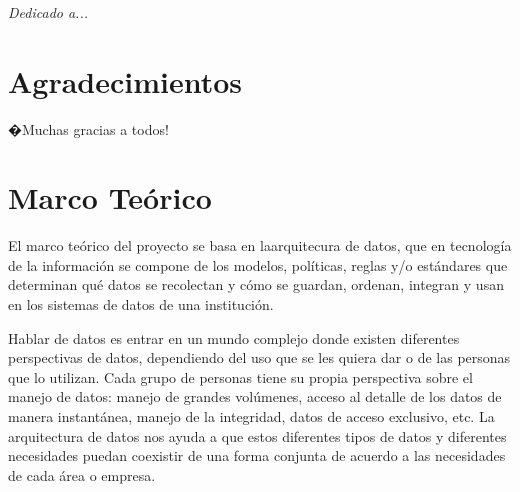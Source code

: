 \documentclass[a4paper,openright,12pt]{book}
\begin{document}
\newpage
$\ $
\thispagestyle{empty} %

\chapter*{}
\begin{flushright}
\textit{Dedicado a... \\}
\end{flushright}


\chapter*{Agradecimientos} %
 
�Muchas gracias a todos!

\tableofcontents %

\cleardoublepage
{} %
\listoffigures %

\cleardoublepage
{} %
\listoftables %

\chapter*{Marco Te\'orico} \label{cap.mteorico}%

El marco te\'orico del proyecto se basa en laarquitecura de datos, que en tecnolog\'ia de la informaci\'on se compone de los modelos, pol\'iticas, reglas y/o est\'andares que determinan qu\'e datos se recolectan y c\'omo se guardan, ordenan, integran y usan en los sistemas de datos de una instituci\'on.

Hablar de datos es entrar en un mundo complejo donde existen diferentes perspectivas de datos, dependiendo del uso que se les quiera dar o de las personas que lo utilizan. Cada grupo de personas tiene su propia perspectiva sobre el manejo de datos: manejo de grandes vol\'umenes, acceso al detalle de los datos de manera instant\'anea, manejo de la integridad, datos de acceso exclusivo, etc. La arquitectura de datos nos ayuda a que estos diferentes tipos de datos y diferentes necesidades puedan coexistir de una forma conjunta de acuerdo a las necesidades de cada \'area o empresa. 
\end{document}
